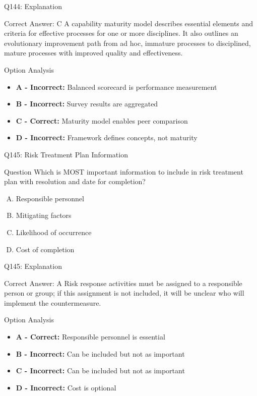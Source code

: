 \documentclass{beamer}
\begin{document}
	\begin{frame}{Q144: Explanation}
		\begin{block}{Correct Answer: C}
			A capability maturity model describes essential elements and criteria for effective processes for one or more disciplines. It also outlines an evolutionary improvement path from ad hoc, immature processes to disciplined, mature processes with improved quality and effectiveness.
		\end{block}
		\begin{block}{Option Analysis}
			\begin{itemize}
				\item \textbf{A - Incorrect:} Balanced scorecard is performance measurement
				\item \textbf{B - Incorrect:} Survey results are aggregated
				\item \textbf{C - Correct:} Maturity model enables peer comparison
				\item \textbf{D - Incorrect:} Framework defines concepts, not maturity
			\end{itemize}
		\end{block}
	\end{frame}
	
	\begin{frame}{Q145: Risk Treatment Plan Information}
		\begin{block}{Question}
			Which is MOST important information to include in risk treatment plan with resolution and date for completion?
		\end{block}
		\begin{enumerate}[(A)]
			\item Responsible personnel
			\item Mitigating factors
			\item Likelihood of occurrence
			\item Cost of completion
		\end{enumerate}
	\end{frame}
	
	\begin{frame}{Q145: Explanation}
		\begin{block}{Correct Answer: A}
			Risk response activities must be assigned to a responsible person or group; if this assignment is not included, it will be unclear who will implement the countermeasure.
		\end{block}
		\begin{block}{Option Analysis}
			\begin{itemize}
				\item \textbf{A - Correct:} Responsible personnel is essential
				\item \textbf{B - Incorrect:} Can be included but not as important
				\item \textbf{C - Incorrect:} Can be included but not as important
				\item \textbf{D - Incorrect:} Cost is optional
			\end{itemize}
		\end{block}
	\end{frame}
	
\end{document}
